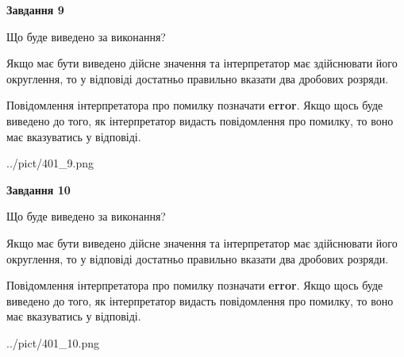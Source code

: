 \documentclass[12pt, ukrainian]{article}
\begin{document}
{\begin {Large}
{\begin {center}\textbf{Завдання 9}\end {center}}\par
Що буде виведено за виконання? \par

Якщо має бути виведено дійсне значення та інтерпретатор має здійснювати його округлення, 
то у відповіді достатньо правильно вказати два дробових розряди.

Повідомлення інтерпретатора про помилку позначати \textbf{error}.
Якщо щось буде виведено до того, як інтерпретатор видасть повідомлення про помилку, 
то воно має вказуватись у відповіді. \par

\begin{center}
	{../pict/401_9.png}
\end{center}
\newpage

{\begin {center}\textbf{Завдання 10}\end {center}}\par
Що буде виведено за виконання? \par

Якщо має бути виведено дійсне значення та інтерпретатор має здійснювати його округлення, 
то у відповіді достатньо правильно вказати два дробових розряди.

Повідомлення інтерпретатора про помилку позначати \textbf{error}.
Якщо щось буде виведено до того, як інтерпретатор видасть повідомлення про помилку, 
то воно має вказуватись у відповіді. \par

\begin{center}
	{../pict/401_10.png}
\end{center}
\newpage

\end {Large}}
\end{document}
